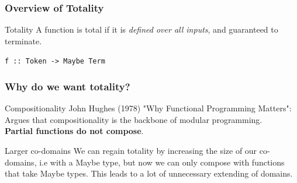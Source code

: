 \documentclass
  [hyperref={colorlinks = true,linkcolor = blue, 
             citecolor = blue, urlcolor = blue}
  ]{beamer}
\begin{document}
\begin{frame}[fragile]
  \frametitle{Overview of Totality}
\begin{block}{Totality}
A function is total if it is \textit{defined over all
inputs}, and guaranteed to terminate.
\end{block}
\texttt{f :: Token -> Maybe Term}
\end{frame}

\begin{frame}[fragile]
\frametitle{Why do we want totality?}
\begin{block}{Compositionality}
John Hughes (1978) "Why Functional Programming Matters":
Argues that compositionality is the backbone of modular
programming. \\ \textbf{Partial functions do not compose}.
\end{block}
\begin{block}{Larger co-domains}
We can regain totality by increasing the size of our
co-domains, i.e with a Maybe type, but now we can only compose
with functions that take Maybe types. This leads to a lot of
unnecessary extending of domains.
\end{block}
\end{frame}
\end{document}

